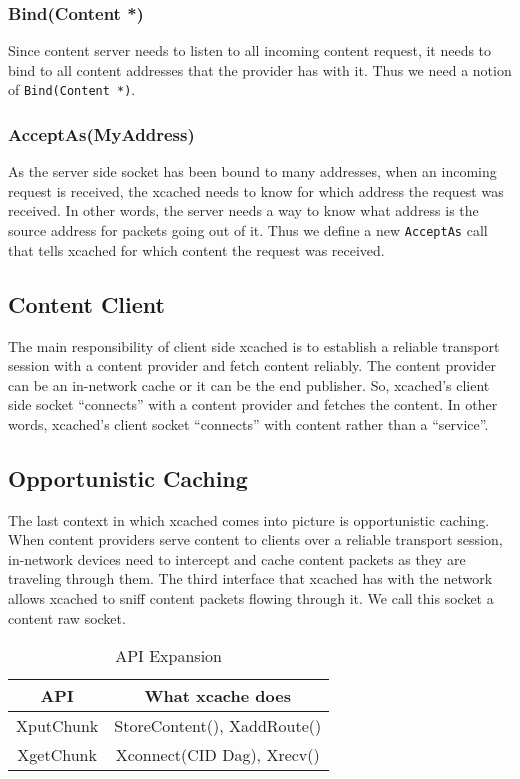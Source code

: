 \subsubsection{Bind(Content *)}
Since content server needs to listen to all incoming content
request, it needs to bind to all content addresses that the provider
has with it. Thus we need a notion of \texttt{Bind(Content *)}.

\subsubsection{AcceptAs(MyAddress)}
As the server side socket has been bound to many addresses, when an
incoming request is received, the xcached needs to know for which
address the request was received. In other words, the server needs a
way to know what address is the source address for packets going out
of it. Thus we define a new \texttt{AcceptAs} call that tells xcached
for which content the request was received.

\subsection{Content Client}
The main responsibility of client side xcached is to establish a
reliable transport session with a content provider and fetch content
reliably. The content provider can be an in-network cache or it can be
the end publisher. So, xcached's client side socket ``connects'' with a
content provider and fetches the content. In other words, xcached's
client socket ``connects'' with content rather than a ``service''.

\subsection{Opportunistic Caching}
The last context in which xcached comes into picture is opportunistic
caching. When content providers serve content to clients over a
reliable transport session, in-network devices need to intercept and
cache content packets as they are traveling through them. The third
interface that xcached has with the network allows xcached to sniff
content packets flowing through it. We call this socket a content raw
socket.

\begin{table}
  \begin{center}
    \begin{tabular}
      {| c | c |}
      API & What xcache does \\
      \hline
      XputChunk & StoreContent(), XaddRoute() \\
      XgetChunk & Xconnect(CID Dag), Xrecv() \\
    \end{tabular}
    \label{tab:apis}
    \caption{API Expansion}
  \end{center}
\end{table}
